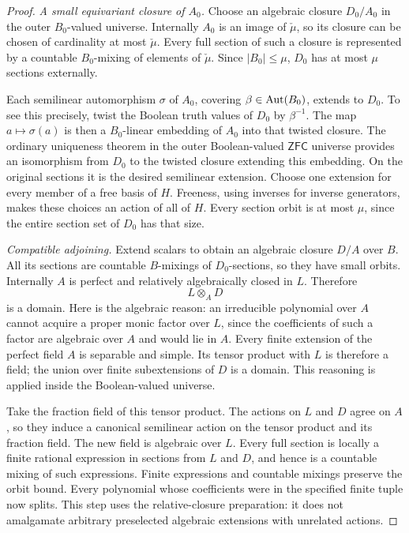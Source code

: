 \documentclass[11pt,a4paper]{article}
\theoremstyle{definition}\newtheorem{definition}[theorem]{Definition}
\theoremstyle{remark}\newtheorem{remark}[theorem]{Remark}
\begin{document}
\begin{proof}
\emph{A small equivariant closure of $A_0$.} Choose an algebraic closure $D_0/A_0$ in the outer $B_0$-valued universe. Internally $A_0$ is an image of $\check\mu$, so its closure can be chosen of cardinality at most $\check\mu$. Every full section of such a closure is represented by a countable $B_0$-mixing of elements of $\check\mu$. Since $|B_0|\leq\mu$, $D_0$ has at most $\mu$ sections externally.

Each semilinear automorphism $\sigma$ of $A_0$, covering $\beta\in\operatorname{Aut}(B_0)$, extends to $D_0$. To see this precisely, twist the Boolean truth values of $D_0$ by $\beta^{-1}$. The map $a\mapsto\sigma(a)$ is then a $B_0$-linear embedding of $A_0$ into that twisted closure. The ordinary uniqueness theorem in the outer Boolean-valued $\mathsf{ZFC}$ universe provides an isomorphism from $D_0$ to the twisted closure extending this embedding. On the original sections it is the desired semilinear extension. Choose one extension for every member of a free basis of $H$. Freeness, using inverses for inverse generators, makes these choices an action of all of $H$. Every section orbit is at most $\mu$, since the entire section set of $D_0$ has that size.

\emph{Compatible adjoining.} Extend scalars to obtain an algebraic closure $D/A$ over $B$. All its sections are countable $B$-mixings of $D_0$-sections, so they have small orbits. Internally $A$ is perfect and relatively algebraically closed in $L$. Therefore
\[
L\otimes_A D
\]
is a domain. Here is the algebraic reason: an irreducible polynomial over $A$ cannot acquire a proper monic factor over $L$, since the coefficients of such a factor are algebraic over $A$ and would lie in $A$. Every finite extension of the perfect field $A$ is separable and simple. Its tensor product with $L$ is therefore a field; the union over finite subextensions of $D$ is a domain. This reasoning is applied inside the Boolean-valued universe.

Take the fraction field of this tensor product. The actions on $L$ and $D$ agree on $A$, so they induce a canonical semilinear action on the tensor product and its fraction field. The new field is algebraic over $L$. Every full section is locally a finite rational expression in sections from $L$ and $D$, and hence is a countable mixing of such expressions. Finite expressions and countable mixings preserve the orbit bound. Every polynomial whose coefficients were in the specified finite tuple now splits. This step uses the relative-closure preparation: it does not amalgamate arbitrary preselected algebraic extensions with unrelated actions.


\end{proof}
\end{document}
